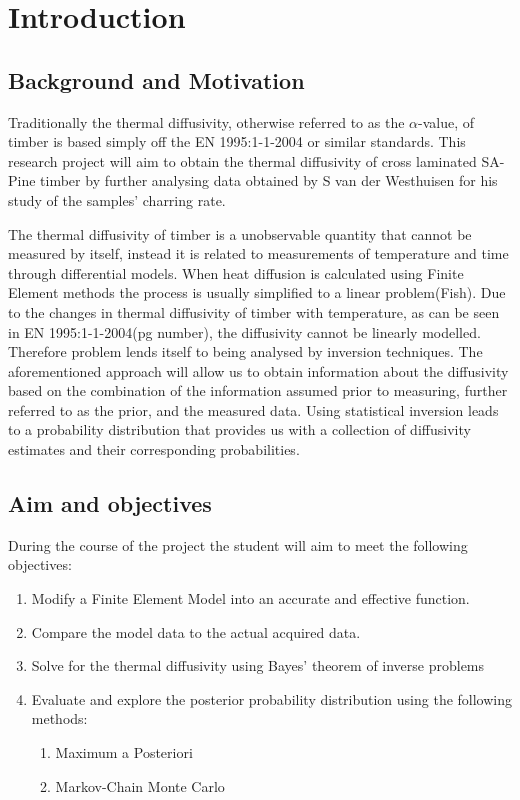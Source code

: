 \chapter{Introduction}
\section{Background and Motivation}

Traditionally the thermal diffusivity, otherwise referred to as the $\alpha$-value, of timber is based simply off the EN 1995:1-1-2004 or similar standards.
This research project will aim to obtain the thermal diffusivity of cross laminated SA-Pine timber by further analysing data obtained by S van der Westhuisen for his study of the samples' charring rate.

The thermal diffusivity of timber is a unobservable quantity that cannot be measured by itself, instead it is related to measurements of temperature and time through differential models. 
When heat diffusion is calculated using Finite Element methods the process is usually simplified to a linear problem(Fish). 
Due to the changes in thermal diffusivity of timber with temperature, as can be seen in EN 1995:1-1-2004(pg number), the diffusivity cannot be linearly modelled. 
Therefore problem lends itself to being analysed by inversion techniques. 
The aforementioned approach will allow us to obtain information about the diffusivity based on the combination of the information assumed prior to measuring, further referred to as the prior, and the measured data. 
Using statistical inversion leads to a probability distribution that provides us with a collection of diffusivity estimates and their corresponding probabilities.\citet{Lin:1997}


\section{Aim and objectives}
During the course of the project the student will aim to meet the following objectives:
\begin{enumerate}
 \item Modify a Finite Element Model into an accurate and effective function.
 \item Compare the model data to the actual acquired data.
 \item Solve for the thermal diffusivity using Bayes' theorem of inverse problems
 \item Evaluate and explore the posterior probability distribution using the following methods:
 	\begin{enumerate}
 		\item Maximum a Posteriori
 		\item Markov-Chain Monte Carlo 	
 	\end{enumerate}
\end{enumerate}

